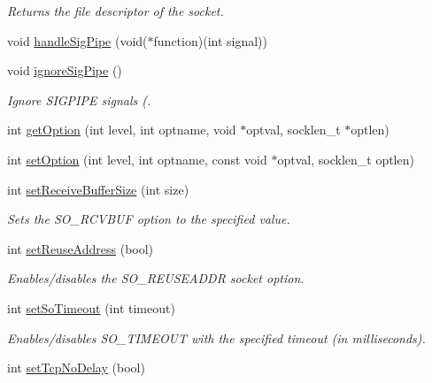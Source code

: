 \begin{DoxyCompactItemize}
\begin{DoxyCompactList}\small\item\em Returns the file descriptor of the socket. \end{DoxyCompactList}\item 
void \hyperlink{classServerSocket_afe81d7c30d1e963e6a043b868560dbbd}{handle\+Sig\+Pipe} (void($\ast$function)(int signal))
\item 
void \hyperlink{classServerSocket_ac159a12414df54dfef149a8de6aacb20}{ignore\+Sig\+Pipe} ()
\begin{DoxyCompactList}\small\item\em Ignore S\+I\+G\+P\+I\+P\+E signals (. \end{DoxyCompactList}\item 
int \hyperlink{classServerSocket_a7ad8a5581c52046e641b32d96eb23406}{get\+Option} (int level, int optname, void $\ast$optval, socklen\+\_\+t $\ast$optlen)
\item 
int \hyperlink{classServerSocket_ad69fa5c5891f028192a291044b9191e2}{set\+Option} (int level, int optname, const void $\ast$optval, socklen\+\_\+t optlen)
\item 
\hypertarget{classServerSocket_ab34154bc6114c638ae02f5e018121099}{int \hyperlink{classServerSocket_ab34154bc6114c638ae02f5e018121099}{set\+Receive\+Buffer\+Size} (int size)}\label{classServerSocket_ab34154bc6114c638ae02f5e018121099}

\begin{DoxyCompactList}\small\item\em Sets the S\+O\+\_\+\+R\+C\+V\+B\+U\+F option to the specified value. \end{DoxyCompactList}\item 
\hypertarget{classServerSocket_ae60d7cc31ad535e5d3cac42e38b8ec98}{int \hyperlink{classServerSocket_ae60d7cc31ad535e5d3cac42e38b8ec98}{set\+Reuse\+Address} (bool)}\label{classServerSocket_ae60d7cc31ad535e5d3cac42e38b8ec98}

\begin{DoxyCompactList}\small\item\em Enables/disables the S\+O\+\_\+\+R\+E\+U\+S\+E\+A\+D\+D\+R socket option. \end{DoxyCompactList}\item 
\hypertarget{classServerSocket_aedb9144c9c375fcb14ac47bcb9d2eb17}{int \hyperlink{classServerSocket_aedb9144c9c375fcb14ac47bcb9d2eb17}{set\+So\+Timeout} (int timeout)}\label{classServerSocket_aedb9144c9c375fcb14ac47bcb9d2eb17}

\begin{DoxyCompactList}\small\item\em Enables/disables S\+O\+\_\+\+T\+I\+M\+E\+O\+U\+T with the specified timeout (in milliseconds). \end{DoxyCompactList}\item 
\hypertarget{classServerSocket_a9e5e1ee852ba26156c757a0086b780fe}{int \hyperlink{classServerSocket_a9e5e1ee852ba26156c757a0086b780fe}{set\+Tcp\+No\+Delay} (bool)}\label{classServerSocket_a9e5e1ee852ba26156c757a0086b780fe}


\end{DoxyCompactItemize}
